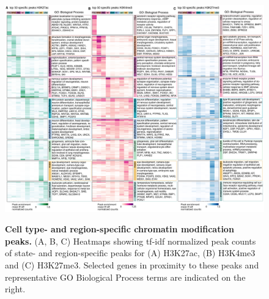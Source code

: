 \begin{figure}[h!]
    \centering
	\includegraphics[width=\textwidth]{figures/cnt/Figure_S3}
    \label{fig:regS3}
    \caption{\textbf{Cell type- and region-specific chromatin modification peaks.}
    (A, B, C) Heatmaps showing tf-idf normalized peak counts of state- and region-specific peaks for (A) H3K27ac, (B) H3K4me3 and (C) H3K27me3. Selected genes in proximity to these peaks and representative GO Biological Process terms are indicated on the right.}
\end{figure}

